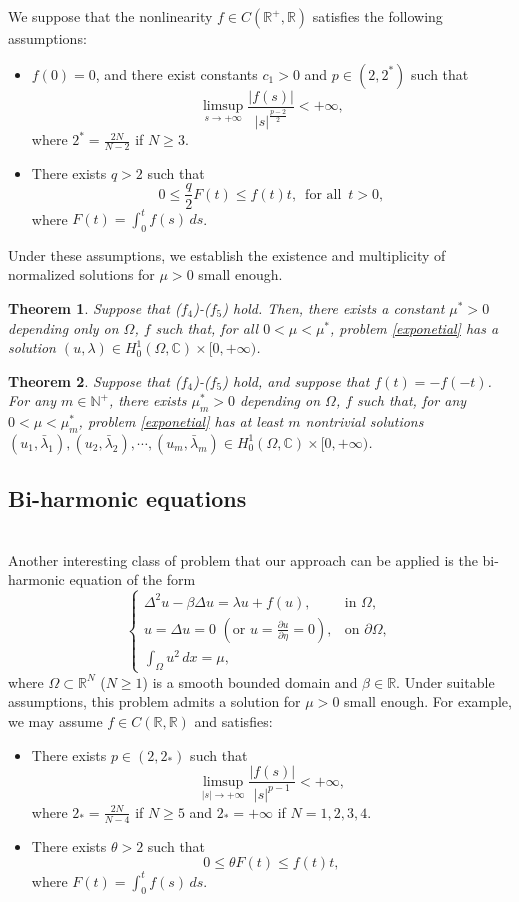 \documentclass[11pt]{amsart}
\newtheorem{theorem}{Theorem}[section]
\newcommand{\R}{\mathbb{R}}
\newcommand{\C}{\mathbb{C}}
\numberwithin{equation}{section}
\begin{document}
We suppose that the nonlinearity $f\in C(\R^+,\R)$  satisfies  the following assumptions:
\begin{itemize}
	\item[$(f_4)$] $f(0)=0$,   and there exist constants $c_1> 0$ and $p \in (2,2^*)$ such that
	$$
	\limsup_{s \to +\infty}	\frac{|f(s)|}{|s|^{\frac{p-2}{2}}} <+\infty ,
	$$
	where $2^*=\frac{2N}{N-2}$ if $N \geq 3$.
\item[$(f_5)$] There exists $q>2$ such that
$$
0 \leq \frac{q}{2}F(t) \leq f(t)t,\,\, \,\text{for all}\,\,\,t > 0,
$$
where $F(t)=\int_{0}^{t}f(s)\,ds$.
\end{itemize}
Under these assumptions, we establish the existence and multiplicity of normalized solutions for $\mu>0$ small enough.
\begin{theorem}
Suppose that ($f_4$)-($f_5$) hold. Then, there exists a constant $\mu^{*}>0$  depending only on $\Omega$, $f$ such that, for all $0<\mu<\mu^{*}$, problem \eqref{exponetial} has a solution $(u,\lambda) \in H^1_0(\Omega,\C) \times  [0,+\infty)$.
\end{theorem}
\begin{theorem}
Suppose that ($f_4$)-($f_5$) hold, and suppose that $f(t)=-f(-t)$. For any $m \in \mathbb{N}^+$, there exists $\mu^{*}_{m} > 0$ depending on $\Omega$, $f$ such that, for any $0 < \mu < \mu^{*}_{m}$, problem \eqref{exponetial}  has at least $m$ nontrivial solutions $(u_1,\bar{\lambda}_1), (u_2,\bar{\lambda}_2),\cdots,(u_m,\bar{\lambda}_m) \in H_0^{1}(\Omega,\C)\times[0,+\infty)$.
\end{theorem}


\subsection{Bi-harmonic equations} \mbox{} \\
Another interesting class of problem that our approach can be applied is the bi-harmonic equation of the form
\begin{equation} \label{eqbi1}
	\left\{
	\begin{array}{ll}
		\Delta^2 u-\beta \Delta u = \lambda u + f(u),\,\,& \text{in}\,\, \Omega, \\
		u =\Delta u= 0 \,\, (\mbox{or}\,\, u=\frac{\partial u}{\partial \eta}=0 ), & \text{on } \partial \Omega, \\
		\int_{\Omega} u^2\,dx = \mu,
	\end{array}
	\right.
\end{equation}
where $\Omega \subset \mathbb{R}^N$ ($N\geq 1$) is a smooth bounded domain and $\beta \in \mathbb{R}$. Under suitable assumptions, this problem admits a solution for $\mu>0$ small enough. For example, we may assume $f \in C(\R,\R)$ and satisfies:
\begin{itemize}
	\item[$(f_6)$] There exists $p \in (2,2_*)$ such that
	$$
	\limsup_{|s| \to +\infty}\frac{|f(s)|}{|s|^{p-1}}<+\infty,
	$$
where $2_* = \frac{2N}{N-4}$ if $N \geq 5$ and $2_* = +\infty$ if $N = 1, 2, 3, 4$.
	\item[$(f_7)$] There exists $\theta>2$ such that
	$$
	0 \leq \theta F(t) \leq f(t)t,
	$$
	where $F(t)=\int_{0}^{t}f(s)\,ds$.
\end{itemize}
\end{document}
